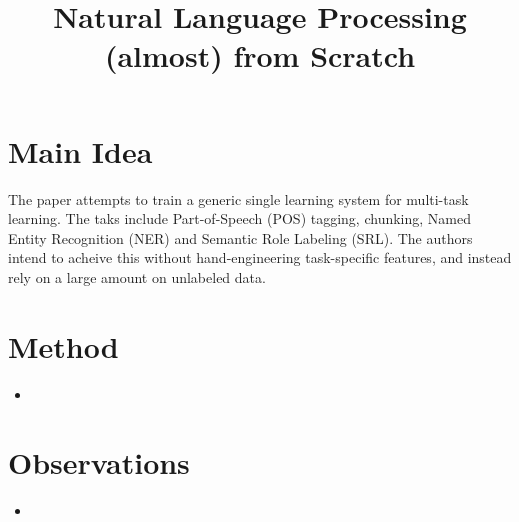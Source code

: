 \documentclass[12pt]{scrartcl}
\begin{document}
\title{Natural Language Processing (almost) from Scratch}
\author{}
\date{}
\maketitle

\section{Main Idea}
  The paper \cite{collobert2011natural} attempts to train a generic single learning system for multi-task learning. The taks include Part-of-Speech (POS) tagging, chunking, Named Entity Recognition (NER) and Semantic Role Labeling (SRL). The authors intend to acheive this without hand-engineering task-specific features, and instead rely on a large amount on unlabeled data.

\section{Method}
  \begin{itemize}
    \item 
  \end{itemize}

\section{Observations}
  \begin{itemize}
    \item 
  \end{itemize}



\end{document}
